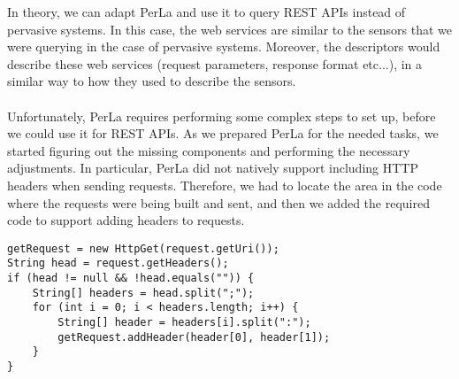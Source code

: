 In theory, we can adapt PerLa and use it to query REST APIs instead of pervasive systems. In this case, the web services are similar to the sensors that we were querying in the case of pervasive systems. Moreover, the descriptors would describe these web services (request parameters, response format etc...), in a similar way to how they used to describe the sensors.\\\\ Unfortunately, PerLa requires performing some complex steps to set up, before we could use it for REST APIs. As we prepared PerLa for the needed tasks, we started figuring out the missing components and performing the necessary adjustments. In particular, PerLa did not natively support including HTTP headers when sending requests. Therefore, we had to locate the area in the code where the requests were being built and sent, and then we added the required code to support adding headers to requests.

\begin{lstlisting}
getRequest = new HttpGet(request.getUri());
String head = request.getHeaders();
if (head != null && !head.equals("")) {
	String[] headers = head.split(";");
	for (int i = 0; i < headers.length; i++) {
		String[] header = headers[i].split(":");
		getRequest.addHeader(header[0], header[1]);
	}
}
\end{lstlisting}

